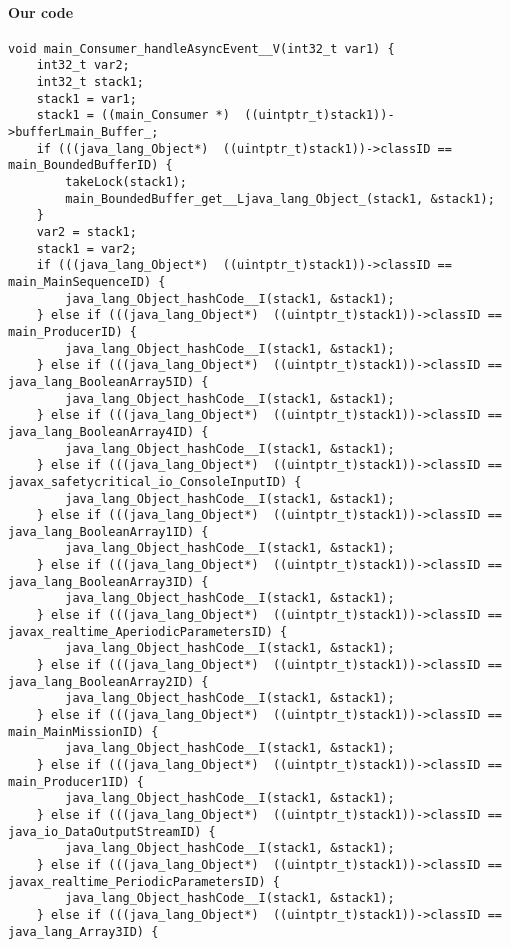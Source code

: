 \paragraph{Our code}\hfill
\begin{lstlisting}[firstnumber=380]
void main_Consumer_handleAsyncEvent__V(int32_t var1) {
	int32_t var2;
	int32_t stack1;
	stack1 = var1;
	stack1 = ((main_Consumer *)  ((uintptr_t)stack1))->bufferLmain_Buffer_;
	if (((java_lang_Object*)  ((uintptr_t)stack1))->classID == main_BoundedBufferID) {
		takeLock(stack1);
		main_BoundedBuffer_get__Ljava_lang_Object_(stack1, &stack1);
	}
	var2 = stack1;
	stack1 = var2;
	if (((java_lang_Object*)  ((uintptr_t)stack1))->classID == main_MainSequenceID) {
		java_lang_Object_hashCode__I(stack1, &stack1);
	} else if (((java_lang_Object*)  ((uintptr_t)stack1))->classID == main_ProducerID) {
		java_lang_Object_hashCode__I(stack1, &stack1);
	} else if (((java_lang_Object*)  ((uintptr_t)stack1))->classID == java_lang_BooleanArray5ID) {
		java_lang_Object_hashCode__I(stack1, &stack1);
	} else if (((java_lang_Object*)  ((uintptr_t)stack1))->classID == java_lang_BooleanArray4ID) {
		java_lang_Object_hashCode__I(stack1, &stack1);
	} else if (((java_lang_Object*)  ((uintptr_t)stack1))->classID == javax_safetycritical_io_ConsoleInputID) {
		java_lang_Object_hashCode__I(stack1, &stack1);
	} else if (((java_lang_Object*)  ((uintptr_t)stack1))->classID == java_lang_BooleanArray1ID) {
		java_lang_Object_hashCode__I(stack1, &stack1);
	} else if (((java_lang_Object*)  ((uintptr_t)stack1))->classID == java_lang_BooleanArray3ID) {
		java_lang_Object_hashCode__I(stack1, &stack1);
	} else if (((java_lang_Object*)  ((uintptr_t)stack1))->classID == javax_realtime_AperiodicParametersID) {
		java_lang_Object_hashCode__I(stack1, &stack1);
	} else if (((java_lang_Object*)  ((uintptr_t)stack1))->classID == java_lang_BooleanArray2ID) {
		java_lang_Object_hashCode__I(stack1, &stack1);
	} else if (((java_lang_Object*)  ((uintptr_t)stack1))->classID == main_MainMissionID) {
		java_lang_Object_hashCode__I(stack1, &stack1);
	} else if (((java_lang_Object*)  ((uintptr_t)stack1))->classID == main_Producer1ID) {
		java_lang_Object_hashCode__I(stack1, &stack1);
	} else if (((java_lang_Object*)  ((uintptr_t)stack1))->classID == java_io_DataOutputStreamID) {
		java_lang_Object_hashCode__I(stack1, &stack1);
	} else if (((java_lang_Object*)  ((uintptr_t)stack1))->classID == javax_realtime_PeriodicParametersID) {
		java_lang_Object_hashCode__I(stack1, &stack1);
	} else if (((java_lang_Object*)  ((uintptr_t)stack1))->classID == java_lang_Array3ID) {

\end{lstlisting}
